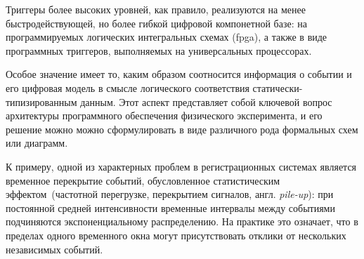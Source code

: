 Триггеры более высоких уровней, как правило, реализуются на менее
быстродействующей, но более гибкой цифровой компонетной базе:
на программируемых
логических интегральных схемах (\acrshort{fpga}), а также в виде
программных триггеров, выполняемых на
универсальных процессорах.


Особое значение имеет то, каким образом соотносится информация о
событии и его цифровая модель в смысле логического соответствия
статически-типизированным данным. Этот аспект представляет собой ключевой вопрос
архитектуры программного обеспечения физического эксперимента, и его решение
можно можно сформулировать в виде различного рода формальных схем или
диаграмм.


К примеру, одной из характерных проблем в регистрационных системах является
временное перекрытие событий, обусловленное статистическим
эффектом~(частотной перегрузке, перекрытием
сигналов, англ. \emph{pile-up}): при постоянной средней интенсивности временные
интервалы между событиями подчиняются экспоненциальному
распределению. На практике это означает, что в пределах одного
временного окна могут присутствовать отклики
от нескольких независимых событий.


